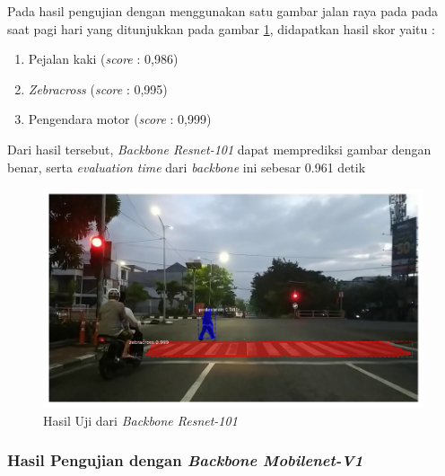 Pada hasil pengujian dengan menggunakan satu gambar jalan raya pada pada saat pagi hari yang ditunjukkan pada gambar \ref{fig:hasil-resnet101}, didapatkan hasil skor yaitu :
\begin{enumerate}[nolistsep]
	\item Pejalan kaki (\textit{score} : 0,986)
	\item \textit{Zebracross} (\textit{score} : 0,995)
	\item Pengendara motor (\textit{score} : 0,999)
\end{enumerate}
Dari hasil tersebut, \textit{Backbone Resnet-101} dapat memprediksi gambar dengan benar, serta \textit{evaluation time} dari \textit{backbone} ini sebesar 0.961 detik
\begin{figure}[h] 
	\centering
	\includegraphics[scale=0.3]{gambar/hasil/resnet-101_fajar_800.png}
	\caption{Hasil Uji dari \textit{Backbone Resnet-101}}
	\label{fig:hasil-resnet101}
\end{figure}

\subsubsection{Hasil Pengujian dengan \textit{Backbone Mobilenet-V1}}

